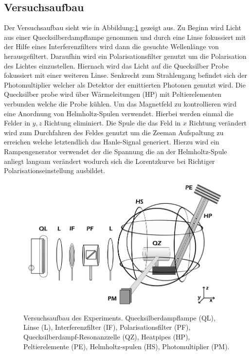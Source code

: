 \subsection{Versuchsaufbau}
Der Versuchsaufbau sieht wie in Abbildung:\ref{VAufbau} gezeigt aus. Zu Beginn wird Licht aus einer Quecksilberdampflampe genommen und durch eine Linse fokussiert mit der Hilfe eines Interferenzfilters wird dann die gesuchte Wellenlänge von herausgefiltert. Daraufhin wird ein Polarisationsfilter genutzt um die Polarisation des Lichtes einzustellen. Hiernach wird das Licht auf die Quecksilber Probe fokussiert mit einer weiteren Linse. Senkrecht zum Strahlengang befindet sich der Photomultiplier welcher als Detektor der emittierten Photonen genutzt wird. Die Quecksilber probe wird über Wärmeleitungen (HP) mit Peltierelementen verbunden welche die Probe kühlen. Um das Magnetfeld zu kontrollieren wird eine Anordnung von Helmholtz-Spulen verwendet. Hierbei werden einmal die Felder in $y,z$ Richtung eliminiert. Die Spule die das Feld in $x$ Richtung verändert wird zum Durchfahren des Feldes genutzt um die Zeeman Aufspaltung zu erreichen welche letztendlich das Hanle-Signal generiert. Hierzu wird ein Rampengenerator verwendet der die Spannung die an der Helmholtz-Spule anliegt langsam verändert wodurch sich die Lorentzkurve bei Richtiger Polarisationseinstellung ausbildet.
\begin{figure}[ht]
	\includegraphics[scale=0.9]{Bild/VAufbau}
	\centering
	\caption[Versuchsaufbau]{Versuchsaufbau des Experiments. Quecksilberdampflampe (QL), Linse (L), Interferenzfilter (IF), Polarisationsfilter (PF), Quecksilberdampf-Resonanzzelle (QZ), Heatpipes (HP), Peltierelemente (PE), Helmholtz-spulen (HS), Photomultiplier (PM). \cite{anleitung}}
	\label{VAufbau}
\end{figure} 
\FloatBarrier
